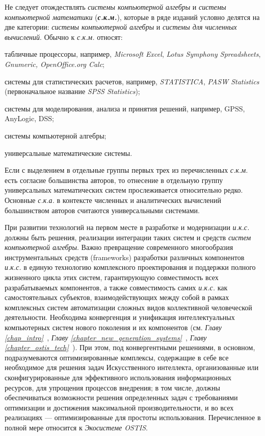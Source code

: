 Не следует отождествлять \textit{системы компьютерной алгебры} и \textit{системы компьютерной математики} (\textbf{\textit{с.к.м.}}), которые в ряде изданий условно делятся на две категории: \textit{системы компьютерной алгебры} и \textit{системы для численных вычислений}. Обычно к \textit{с.к.м.} относят:
\begin{textitemize}
	\item табличные процессоры, например, \textit{Microsoft Excel}, \textit{Lotus Symphony Spreadsheets}, \textit{Gnumeric, OpenOffice.org Calc};
	\item системы для статистических расчетов, например, \textit{STATISTICA}, \textit{PASW Statistics} (первоначальное название \textit{SPSS Statistics});
	\item системы для моделирования, анализа и принятия решений, например, GPSS, AnyLogic, DSS;
	\item системы компьютерной алгебры;
	\item универсальные математические системы.
\end{textitemize}

Если с выделением в отдельные группы первых трех из перечисленных \textit{с.к.м.} есть согласие большинства авторов, то отнесение в отдельную группу универсальных математических систем прослеживается относительно редко. Основные \textit{с.к.а.} в контексте численных и аналитических вычислений большинством авторов считаются универсальными системами.

При развитии технологий на первом месте в разработке и модернизации \textit{и.к.с.} должны быть решения, реализации интеграции таких систем и средств \textit{систем компьютерной алгебры}. 
Важно превращение современного многообразия инструментальных средств (frameworks) разработки различных компонентов \textit{и.к.с.} в единую технологию комплексного проектирования и поддержки полного жизненного цикла этих систем, гарантирующую совместимость всех разрабатываемых компонентов, а также совместимость самих \textit{и.к.с.} как самостоятельных субъектов, взаимодействующих между собой в рамках комплексных систем автоматизации сложных видов коллективной человеческой деятельности. Необходима конвергенция и унификация интеллектуальных компьютерных систем нового поколения и их компонентов (см. \textit{Главу \ref{chap_intro}~}, \textit{Главу \ref{chapter_new_generation_systems}~}, \textit{Главу \ref{chapter_ostis_tech}~}). 
При этом, под конвергентными решениями, в основном, подразумеваются оптимизированные комплексы, содержащие в себе все необходимое для решения задач Искусственного интеллекта, организованные или сконфигурированные для эффективного использования информационных ресурсов, для упрощения процессов внедрения; в том числе, должны обеспечиваться возможности решения определенных задач с требованиями оптимизации и достижения максимальной производительности, и во всех реализациях --- оптимизированные для простоты использования. Перечисленное в полной мере относится к \textit{Экосистеме OSTIS}. 

